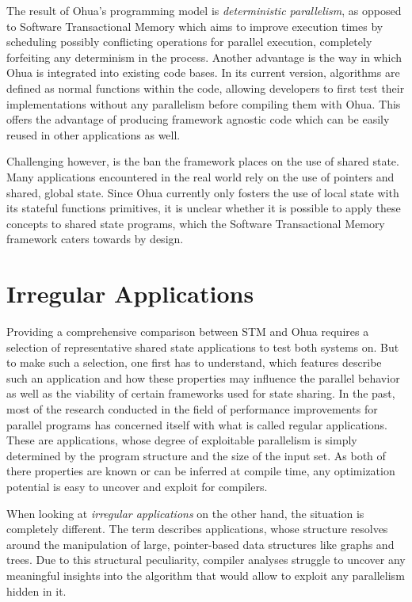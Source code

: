 The result of Ohua's programming model is \emph{deterministic parallelism}, as opposed to Software Transactional Memory which aims to improve execution times by scheduling possibly conflicting operations for parallel execution, completely forfeiting any determinism in the process.
Another advantage is the way in which Ohua is integrated into existing code bases.
In its current version, algorithms are defined as normal functions within the code, allowing developers to first test their implementations without any parallelism before compiling them with Ohua.
This offers the advantage of producing framework agnostic code which can be easily reused in other applications as well.

Challenging however, is the ban the framework places on the use of shared state.
Many applications encountered in the real world rely on the use of pointers and shared, global state.
Since Ohua currently only fosters the use of local state with its stateful functions primitives, it is unclear whether it is possible to apply these concepts to shared state programs, which the Software Transactional Memory framework caters towards by design.


\section{Irregular Applications}
\label{sec:background:irregular}

Providing a comprehensive comparison between STM and Ohua requires a selection of representative shared state applications to test both systems on.
But to make such a selection, one first has to understand, which features describe such an application and how these properties may influence the parallel behavior as well as the viability of certain frameworks used for state sharing.
In the past, most of the research conducted in the field of performance improvements for parallel programs has concerned itself with what is called regular applications.
These are applications, whose degree of exploitable parallelism is simply determined by the program structure and the size of the input set.
As both of there properties are known or can be inferred at compile time, any optimization potential is easy to uncover and exploit for compilers.

When looking at \emph{irregular applications} on the other hand, the situation is completely different.
The term describes applications, whose structure resolves around the manipulation of large, pointer-based data structures like graphs and trees.
Due to this structural peculiarity, compiler analyses struggle to uncover any meaningful insights into the algorithm that would allow to exploit any parallelism hidden in it.


